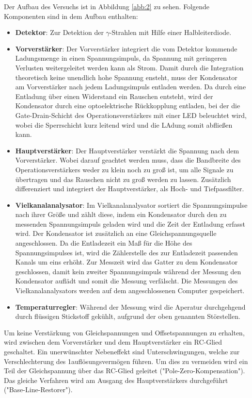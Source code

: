 Der Aufbau des Versuchs ist in Abbildung \ref{abb:2} zu sehen. Folgende
Komponenten sind in dem Aufbau enthalten:
\begin{itemize}
  \item \textbf{Detektor}: Zur Detektion der $\gamma$-Strahlen mit Hilfe
  einer Halbleiterdiode.
  \item \textbf{Vorverstärker}: Der Vorverstärker integriert die vom Detektor
  kommende Ladungsmenge in einen Spannungsimpuls, da Spannung mit geringeren
  Verlusten weitergeleitet werden kann als Strom. Damit durch die Integration
  theoretisch keine unendlich hohe Spannung ensteht, muss der Kondensator am
  Vorverstärker nach jedem Ladungsimpuls entladen werden. Da durch eine
  Entladung über einen Widerstand ein Rauschen entsteht, wird der Kondensator
  durch eine optoelektrische Rückkopplung entladen, bei der die Gate-Drain-Schicht
  des Operationsverstärkers mit einer LED beleuchtet wird, wobei die
  Sperrschicht kurz leitend wird und die LAdung somit abfließen kann.
  \item \textbf{Hauptverstärker}: Der Hauptverstärker verstärkt die Spannung
  nach dem Vorverstärker. Wobei darauf geachtet werden muss, dass die Bandbreite
  des Operationsverstärkers weder zu klein noch zu groß ist, um alle Signale zu
  übertragen und das Rauschen nicht zu groß werden zu lassen.
  Zusätzlich differenziert und integriert der Hauptverstärker, als Hoch- und
  Tiefpassfilter.
  \item \textbf{Vielkanalanalysator}: Im Vielkanalanalysator sortiert
  die Spannungsimpulse nach ihrer Größe und zählt diese, indem ein Kondensator
  durch den zu messenden Spannungsimpuls geladen wird und die Zeit der
  Entladung erfasst wird. Der Kondensator ist zusätzlich an eine
  Gleichspannungsquelle angeschlossen. Da die Entladezeit ein Maß für die
  Höhe des Spannungsimpulses ist, wird die Zählerstelle des zur Entladezeit
  passenden Kanals um eins erhöht. Zur Messzeit wird das Gatter zu dem Kondensator
  geschlossen, damit kein zweiter Spannungsimpuls während der Messung
  den Kondensator auflädt und somit die Messung verfälscht.
  Die Messungen des Vielkanalanalysators werden auf dem angeschlossenen
  Computer gespeichert.
  \item \textbf{Temperaturregler}: Während der Messung wird die Aperatur
  durchgehgend durch flüssigen Stickstoff gekühlt, aufgrund der oben genannten
  Störstellen.
\end{itemize}

Um keine Verstärkung von Gleichspannungen und Offsetspannungen zu erhalten, wird
zwischen dem Vorverstärker und dem Hauptverstärker ein RC-Glied geschaltet. Ein
unerwünschter Nebeneffekt sind Unterschwingungen, welche zur Verschlechterung
des 1auflösungsvermögen führen. Um dies zu vermeiden wird ein Teil der
Gleichspannung über das RC-Glied geleitet ("Pole-Zero-Kompensation"). Das gleiche
Verfahren wird am Ausgang des Hauptverstärkers durchgeführt
("Base-Line-Restorer").

